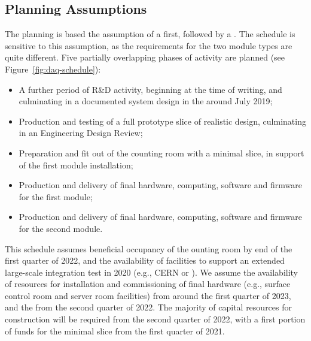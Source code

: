 \subsection{Planning Assumptions}
\label{sec:fd-daq-org-assmp}

The  planning is based the assumption of a  first, followed by a . The schedule is sensitive to this assumption, as the  requirements for the two module types are quite different. Five partially overlapping phases of activity are planned (see Figure~\ref{fig:daq-schedule}):

\begin{itemize}
	\item A further period of R\&D activity, beginning at the time of writing, and culminating in a documented system design in the  around July 2019;
	\item Production and testing of a full prototype  slice of realistic design, culminating in an Engineering Design Review;
	\item Preparation and fit out of the  counting room with a minimal  slice, in support of the first module installation;
	\item Production and delivery of final hardware, computing, software and firmware for the first module;
	\item Production and delivery of final hardware, computing, software and firmware for the second module.
\end{itemize}

This schedule assumes beneficial occupancy of the  ounting room by end of the first quarter of 2022, and the availability of facilities to support an extended large-scale integration test in 2020 (e.g., CERN or \fnal). We assume the availability of resources for installation and commissioning of final  hardware (e.g., surface control room and server room facilities) from around the first quarter of 2023, and the  from the second quarter of 2022. The majority of capital resources for  construction will be required from the second quarter of 2022, with a first %
portion of funds for the minimal  slice from the first quarter of 2021.


